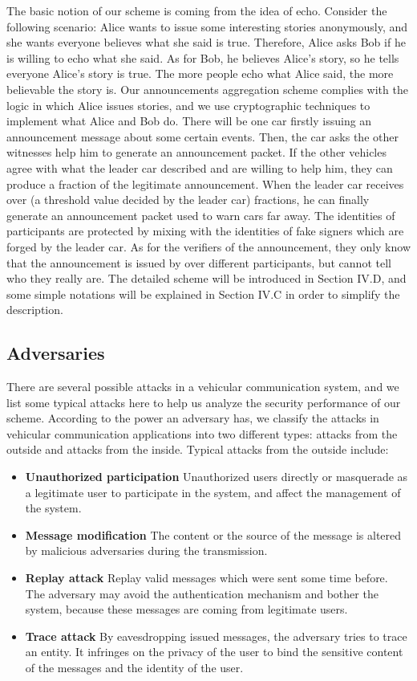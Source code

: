 \documentclass[a4paper]{article}
\begin{document}
The basic notion of our scheme is coming from the idea of echo. Consider the following scenario: Alice wants to issue some interesting stories anonymously, and she wants everyone believes what she said is true. Therefore, Alice asks Bob if he is willing to echo what she said. As for Bob, he believes Alice's story, so he tells everyone Alice's story is true. The more people echo what Alice said, the more believable the story is. Our announcements aggregation scheme complies with the logic in which Alice issues stories, and we use cryptographic techniques to implement what Alice and Bob do. There will be one car firstly issuing an announcement message about some certain events. Then, the car asks the other witnesses help him to generate an announcement packet. If the other vehicles agree with what the leader car described and are willing to help him, they can produce a fraction of the legitimate announcement. When the leader car receives over  (a threshold value decided by the leader car) fractions, he can finally generate an announcement packet used to warn cars far away. The identities of participants are protected by mixing with the identities of fake signers which are forged by the leader car. As for the verifiers of the announcement, they only know that the announcement is issued by over  different participants, but cannot tell who they really are. The detailed scheme will be introduced in Section IV.D, and some simple notations will be explained in Section IV.C in order to simplify the description.

\subsection{Adversaries}
There are several possible attacks in a vehicular communication system, and we list some typical attacks here to help us analyze the security performance of our scheme. According to the power an adversary has, we classify the attacks in vehicular communication applications into two different types: attacks from the outside and attacks from the inside. Typical attacks from the outside include:
\begin{itemize}
  \item \textbf{Unauthorized participation} Unauthorized users directly or masquerade as a legitimate user to participate in the system, and affect the management of the system.
  \item \textbf{Message modification} The content or the source of the message is altered by malicious adversaries during the transmission.
  \item \textbf{Replay attack} Replay valid messages which were sent some time before. The adversary may avoid the authentication mechanism and bother the system, because these messages are coming from legitimate users.
  \item \textbf{Trace attack} By eavesdropping issued messages, the adversary tries to trace an entity. It infringes on the privacy of the user to bind the sensitive content of the messages and the identity of the user.
\end{itemize}
\end{document}
